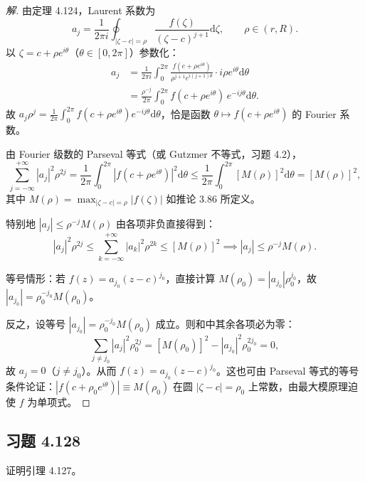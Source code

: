 \documentclass[11pt,a4paper]{article}
\newcommand{\dd}{\mathrm{d}}
\theoremstyle{definition}
\newenvironment{solution}{\begin{proof}[解]}{\end{proof}}
\begin{document}
\begin{solution}
  由定理 4.124，Laurent 系数为
  \[
    a_j = \frac{1}{2\pi i} \oint_{|\zeta-c|=\rho}
    \frac{f(\zeta)}{(\zeta-c)^{j+1}} \dd\zeta, \qquad \rho \in (r, R).
  \]
  以 $\zeta = c + \rho e^{i\theta}$（$\theta \in [0, 2\pi]$）参数化：
  \begin{align*}
    a_j &= \frac{1}{2\pi i} \int_{0}^{2\pi}
    \frac{f(c + \rho e^{i\theta})}{\rho^{j+1} e^{i(j+1)\theta}}
    \cdot i\rho e^{i\theta} \dd\theta\\
    &= \frac{\rho^{-j}}{2\pi} \int_{0}^{2\pi}
    f(c + \rho e^{i\theta}) \, e^{-ij\theta} \dd\theta.
  \end{align*}
  故 $a_j \rho^j = \frac{1}{2\pi} \int_0^{2\pi} f(c + \rho e^{i\theta}) e^{-ij\theta} \dd\theta$，恰是函数 $\theta \mapsto f(c + \rho e^{i\theta})$ 的 Fourier 系数。

  由 Fourier 级数的 Parseval 等式（或 Gutzmer 不等式，习题 4.2），
  \[
    \sum_{j=-\infty}^{+\infty} |a_j|^2 \rho^{2j}
    = \frac{1}{2\pi} \int_{0}^{2\pi} |f(c + \rho e^{i\theta})|^2 \dd\theta
    \le \frac{1}{2\pi} \int_{0}^{2\pi} [M(\rho)]^2 \dd\theta
    = [M(\rho)]^2,
  \]
  其中 $M(\rho) = \max_{|\zeta-c|=\rho} |f(\zeta)|$ 如推论 3.86 所定义。

  特别地 $|a_j| \le \rho^{-j} M(\rho)$ 由各项非负直接得到：
  \[
    |a_j|^2 \rho^{2j} \le \sum_{k=-\infty}^{+\infty} |a_k|^2 \rho^{2k}
    \le [M(\rho)]^2 \implies |a_j| \le \rho^{-j} M(\rho).
  \]

  等号情形：若 $f(z) = a_{j_0}(z-c)^{j_0}$，直接计算 $M(\rho_0) = |a_{j_0}| \rho_0^{j_0}$，故 $|a_{j_0}| = \rho_0^{-j_0} M(\rho_0)$。

  反之，设等号 $|a_{j_0}| = \rho_0^{-j_0} M(\rho_0)$ 成立。则和中其余各项必为零：
  \[
    \sum_{j \ne j_0} |a_j|^2 \rho_0^{2j}
    = [M(\rho_0)]^2 - |a_{j_0}|^2 \rho_0^{2j_0} = 0,
  \]
  故 $a_j = 0$（$j \ne j_0$）。从而 $f(z) = a_{j_0}(z-c)^{j_0}$。这也可由 Parseval 等式的等号条件论证：$|f(c + \rho_0 e^{i\theta})| \equiv M(\rho_0)$ 在圆 $|\zeta-c| = \rho_0$ 上常数，由最大模原理迫使 $f$ 为单项式。
\end{solution}

\subsection{习题 4.128}

证明引理 4.127。
\end{document}
